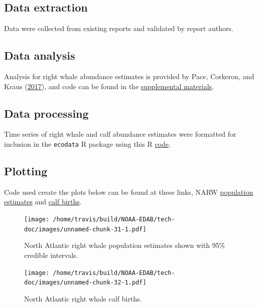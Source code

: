 \documentclass[
]{book}
\begin{document}
\hypertarget{data-extraction-26}{%
\subsection{Data extraction}\label{data-extraction-26}}

Data were collected from existing reports and validated by report authors.

\hypertarget{data-analysis-28}{%
\subsection{Data analysis}\label{data-analysis-28}}

Analysis for right whale abundance estimates is provided by Pace, Corkeron, and Kraus (\protect\hyperlink{ref-Pace2017}{2017}), and code can be found in the \href{https://onlinelibrary.wiley.com/action/downloadSupplement?doi=10.1002\%2Fece3.3406\&file=ece33406-sup-0001-SupInfo.docx}{supplemental materials}.

\hypertarget{data-processing-21}{%
\subsection{Data processing}\label{data-processing-21}}

Time series of right whale and calf abundance estimates were formatted for inclusion in the \texttt{ecodata} R package using this R \href{https://github.com/NOAA-EDAB/ecodata/blob/master/data-raw/get_narw.R}{code}.

\hypertarget{plotting-23}{%
\subsection{Plotting}\label{plotting-23}}

Code used create the plots below can be found at these links, NARW \href{https://github.com/NOAA-EDAB/ecodata/blob/master/chunk-scripts/macrofauna.Rmd-NARW-abundance.R}{population estimates} and \href{https://github.com/NOAA-EDAB/ecodata/blob/master/chunk-scripts/macrofauna.Rmd-NARW-calf-abundance.R}{calf births}.

\begin{figure}
\centering
\texttt{[image: /home/travis/build/NOAA-EDAB/tech-doc/images/unnamed-chunk-31-1.pdf]}
\caption{\label{fig:unnamed-chunk-31}North Atlantic right whale population estimates shown with 95\% credible intervals.}
\end{figure}

\begin{figure}
\centering
\texttt{[image: /home/travis/build/NOAA-EDAB/tech-doc/images/unnamed-chunk-32-1.pdf]}
\caption{\label{fig:unnamed-chunk-32}North Atlantic right whale calf births.}
\end{figure}
\end{document}
